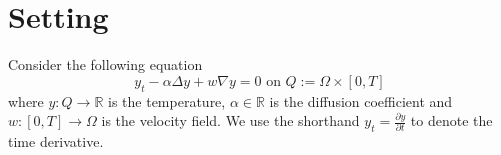 \documentclass[
12pt, %
a4paper, %
onecolumn, %
portrait %
]{article}
\begin{document}
\pagestyle{myheadings} %
\markright{\doctitle} %


\thispagestyle{plain} %

\printtitle %

\section{Setting}
Consider the following equation
\begin{equation}
y_t -  \alpha \Delta y + w \nabla y = 0 \text{ on } Q := \Omega \times [0,T]
\label{eq:pde}
\end{equation}
where $y : Q \rightarrow \mathbb{R}$ is the temperature, $\alpha \in \mathbb{R}$ is the diffusion coefficient and $w : [0,T] \rightarrow \Omega$ is the velocity field. We use the shorthand $y_t = \frac{\partial y}{\partial t}$ to denote the time derivative.
\end{document}
